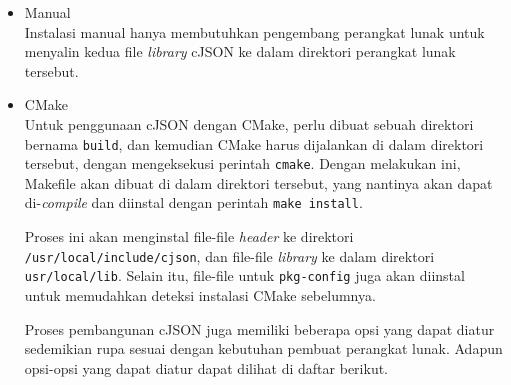 \begin{itemize}
	\item Manual\\
	Instalasi manual hanya membutuhkan pengembang perangkat lunak untuk menyalin kedua file \textit{library} cJSON ke dalam direktori perangkat lunak tersebut.
	\item CMake\\
	Untuk penggunaan cJSON dengan CMake, perlu dibuat sebuah direktori bernama \verb|build|, dan kemudian CMake harus dijalankan di dalam direktori tersebut, dengan mengeksekusi perintah \verb|cmake|. Dengan melakukan ini, Makefile akan dibuat di dalam direktori tersebut, yang nantinya akan dapat di-\textit{compile} dan diinstal dengan perintah \verb|make install|.
	
	Proses ini akan menginstal file-file \textit{header} ke direktori \verb|/usr/local/include/cjson|, dan file-file \textit{library} ke dalam direktori \verb|usr/local/lib|. Selain itu, file-file untuk \verb|pkg-config| juga akan diinstal untuk memudahkan deteksi instalasi CMake sebelumnya.
	
	Proses pembangunan cJSON juga memiliki beberapa opsi yang dapat diatur sedemikian rupa sesuai dengan kebutuhan pembuat perangkat lunak. Adapun opsi-opsi yang dapat diatur dapat dilihat di daftar berikut.


\end{itemize}
